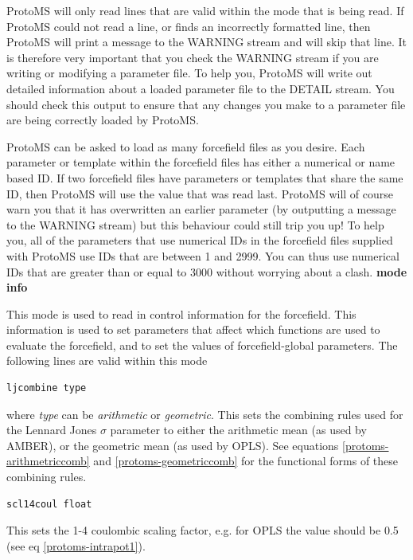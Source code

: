 \documentclass[letterpaper,10pt,english]{manual}
\begin{document}
ProtoMS will only read lines that are valid within the mode that is being read. If ProtoMS could not read a line, or finds an incorrectly formatted line, then ProtoMS will print a message to the WARNING stream and will skip that line. It is therefore very important that you check the WARNING stream if you are writing or modifying a parameter file. To help you, ProtoMS will write out detailed information about a loaded parameter file to the DETAIL stream. You should check this output to ensure that any changes you make to a parameter file are being
correctly loaded by ProtoMS.

ProtoMS can be asked to load as many forcefield files as you desire. Each parameter or template within the forcefield files has either a numerical or name based ID. If two forcefield files have parameters or templates that share the same ID, then ProtoMS will use the value that was read last. ProtoMS will of course warn you that it has overwritten an earlier parameter (by outputting a message to the WARNING stream) but this behaviour could still trip you up! To help you, all of the parameters that use numerical IDs in the forcefield files supplied with ProtoMS use IDs that are between 1 and 2999. You can thus use numerical IDs that are greater than or equal to 3000 without worrying about a clash.
\textbf{mode info}

This mode is used to read in control information for the forcefield. This information is used to set parameters that affect which functions are used to evaluate the forcefield, and to set the values of forcefield-global parameters. The following lines are valid within this mode

\begin{Verbatim}[commandchars=@\[\]]
ljcombine type
\end{Verbatim}

where \emph{type} can be \emph{arithmetic} or \emph{geometric}. This sets the combining rules used for the Lennard Jones $\sigma$ parameter to either the arithmetic mean (as used by AMBER), or the geometric mean (as used by OPLS). See equations \eqref{protoms-arithmetriccomb} and \eqref{protoms-geometriccomb} for the functional forms of these combining rules.

\begin{Verbatim}[commandchars=@\[\]]
scl14coul float
\end{Verbatim}

This sets the 1-4 coulombic scaling factor, e.g. for OPLS the value should be 0.5 (see eq \eqref{protoms-intrapot1}).
\end{document}
